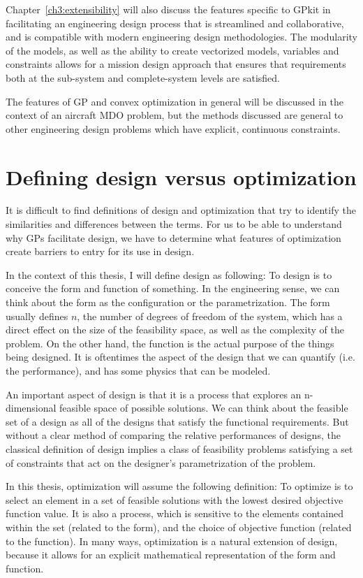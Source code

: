Chapter~\ref{ch3:extensibility} will also discuss the features specific to
GPkit in facilitating
an engineering design process that is streamlined and collaborative, and is
compatible with modern engineering design methodologies. The modularity of the
models, as well as the ability to create vectorized models, variables and constraints
allows for a mission design approach that ensures that
requirements both at the sub-system and complete-system levels are satisfied.

The features of \gls{GP} and convex optimization in general will be discussed in
the context of an aircraft \gls{MDO} problem, but the methods discussed
are general to other engineering design problems which have explicit, continuous constraints.

\section{Defining design versus optimization} \label{s:DesVsOpt}

It is difficult to find definitions of design and optimization that
try to identify the similarities and differences between the terms. For us to be
able to understand why \gls{GP}s facilitate design, we have to determine what
features of optimization create barriers to entry for its use in design.

In the context of this thesis, I will define design as following:
To design is to conceive the form and function of something.
In the engineering sense, we can think about the form as the configuration or
the parametrization. The form usually defines $n$, the number of degrees of freedom
of the system, which has a direct effect on the size of the feasibility
space, as well as the complexity of the problem.
On the other hand, the function is the actual purpose of the things
being designed. It is oftentimes the aspect of the design that we can
quantify (i.e. the performance), and has some physics that can be modeled.

An important aspect of design is that it is a process that explores an
n-dimensional feasible space of possible solutions.
We can think about the feasible set of a design as all of the designs
that satisfy the functional requirements. But without a clear method of comparing
the relative performances of designs, the classical
definition of design implies a class of feasibility problems satisfying a set of
constraints that act on the designer's parametrization of the problem.

In this thesis, optimization will assume the following definition: To optimize is to select an
element in a set of feasible solutions with the lowest desired objective
function value. It is also a process, which is sensitive to the elements contained within the set
(related to the form), and the choice of objective function (related to the
function).
In many ways, optimization is a natural extension of design, because it allows
for an explicit mathematical representation of the form and function.

